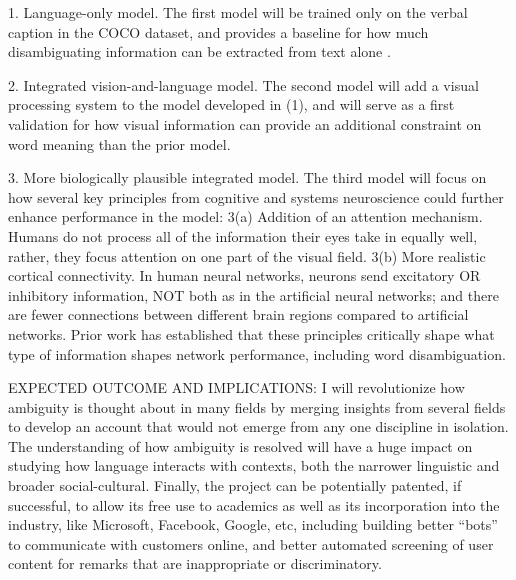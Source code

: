 \documentclass[letterpaper, 12pt]{article}
\begin{document}
1.  Language-only model. The first model will be trained only on the verbal caption in the COCO dataset, and provides a baseline for how much disambiguating information can be extracted from text alone \citep{beekhuizenWhatCompanySemantically2018}.

2.  Integrated vision-and-language model.  The second model will add a visual processing system to the model developed in (1), and will serve as a first validation for how visual information can provide an additional constraint on word meaning than the prior model.

3.  More biologically plausible integrated model.  The third model will focus on how several key principles from cognitive and systems neuroscience could further enhance performance in the model: 3(a) Addition of an attention mechanism. Humans do not process all of the information their eyes take in equally well, rather, they focus attention on one part of the visual field. 3(b) More realistic cortical connectivity. In human neural networks, neurons send excitatory OR inhibitory information, NOT both as in the artificial neural networks; and there are fewer connections between different brain regions compared to artificial networks. Prior work \citep{laszloPSPsERPsApplying2014, Armstrong2016Disparatesemanticambiguity} has established that these principles critically shape what type of information shapes network performance, including word disambiguation. 

EXPECTED OUTCOME AND IMPLICATIONS: I will revolutionize how ambiguity is thought about in many fields by merging insights from several fields to develop an account that would not emerge from any one discipline in isolation. The understanding of how ambiguity is resolved will have a huge impact on studying how language interacts with contexts, both the narrower linguistic and broader social-cultural.  Finally, the project can be potentially patented, if successful, to allow its free use to academics as well as its incorporation into the industry, like Microsoft, Facebook, Google, etc, including building better “bots” to communicate with customers online, and better automated screening of user content for remarks that are inappropriate or discriminatory.
\end{document}
